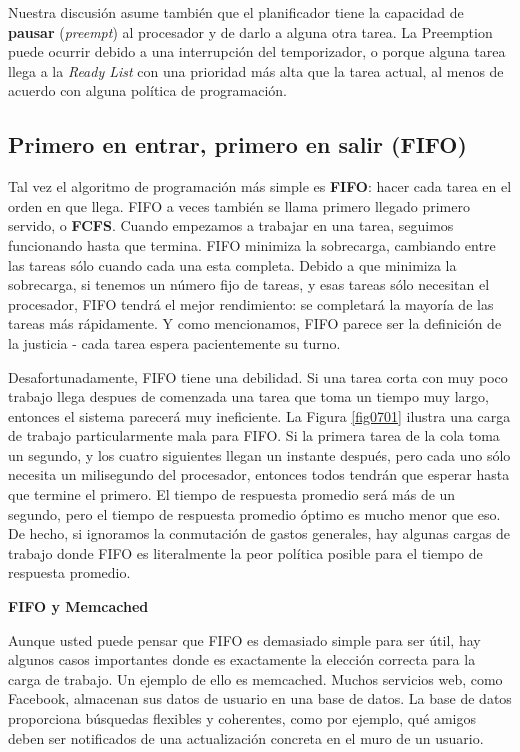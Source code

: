 \documentclass[10pt]{book}
\begin{document}
Nuestra discusión asume también que el planificador tiene la capacidad de \textbf{pausar} (\textit{preempt}) al procesador y de darlo a alguna otra tarea. La Preemption puede ocurrir debido a una interrupción del temporizador, o porque alguna tarea llega a la \textit{Ready List} con una prioridad más alta que la tarea actual, al menos de acuerdo con alguna política de programación.

\subsection{Primero en entrar, primero en salir (FIFO)}
Tal vez el algoritmo de programación más simple es \textbf{FIFO}: hacer cada tarea en el orden en que llega. FIFO a veces también se llama primero llegado primero servido, o \textbf{FCFS}. Cuando empezamos a trabajar en una tarea, seguimos funcionando hasta que termina. FIFO minimiza la sobrecarga, cambiando entre las tareas sólo cuando cada una esta completa. Debido a que minimiza la sobrecarga, si tenemos un número fijo de tareas, y esas tareas sólo necesitan el procesador, FIFO tendrá el mejor rendimiento: se completará la mayoría de las tareas más rápidamente. Y como mencionamos, FIFO parece ser la definición de la justicia - cada tarea espera pacientemente su turno.

Desafortunadamente, FIFO tiene una debilidad. Si una tarea corta con muy poco trabajo llega despues de comenzada una tarea que toma un tiempo muy largo, entonces el sistema parecerá muy ineficiente. La Figura \ref{fig0701} ilustra una carga de trabajo particularmente mala para FIFO. Si la primera tarea de la cola toma un segundo, y los cuatro siguientes llegan un instante después, pero cada uno sólo necesita un milisegundo del procesador, entonces todos tendrán que esperar hasta que termine el primero. El tiempo de respuesta promedio será más de un segundo, pero el tiempo de respuesta promedio óptimo es mucho menor que eso. De hecho, si ignoramos la conmutación de gastos generales, hay algunas cargas de trabajo donde FIFO es literalmente la peor política posible para el tiempo de respuesta promedio.

\textbf{FIFO y Memcached}

Aunque usted puede pensar que FIFO es demasiado simple para ser útil, hay algunos casos importantes donde es exactamente la elección correcta para la carga de trabajo. Un ejemplo de ello es memcached. Muchos servicios web, como Facebook, almacenan sus datos de usuario en una base de datos. La base de datos proporciona búsquedas flexibles y coherentes, como por ejemplo, qué amigos deben ser notificados de una actualización concreta en el muro de un usuario.
\end{document}
